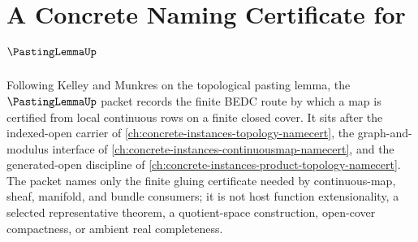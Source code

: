 \chapter{A Concrete Naming Certificate for $\PastingLemmaUp$}
\label{ch:concrete-instances-pasting-lemma-namecert}

Following Kelley and Munkres on the topological pasting lemma, the $\PastingLemmaUp$ packet records the finite BEDC route by which a map is certified from local continuous rows on a finite closed cover. It sits after the indexed-open carrier of \autoref{ch:concrete-instances-topology-namecert}, the graph-and-modulus interface of \autoref{ch:concrete-instances-continuousmap-namecert}, and the generated-open discipline of \autoref{ch:concrete-instances-product-topology-namecert}. The packet names only the finite gluing certificate needed by continuous-map, sheaf, manifold, and bundle consumers; it is not host function extensionality, a selected representative theorem, a quotient-space construction, open-cover compactness, or ambient real completeness.

